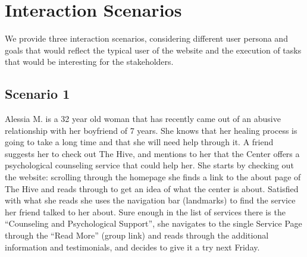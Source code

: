 \pagebreak
\section{Interaction Scenarios}
We provide three interaction scenarios, considering different user persona and goals that would reflect
the typical user of the website and the execution of tasks that would be interesting for the stakeholders.


\subsection{Scenario 1}
Alessia M. is a 32 year old woman that has recently came out of an abusive relationship with her boyfriend of 7 years.
She knows that her healing process is going to take a long time and that she will need help through it.
A friend suggests her to check out The Hive, and mentions to her that the Center offers a psychological counseling service
that could help her. She starts by checking out the website: scrolling through the homepage she finds a link to the about page
of The Hive and reads through to get an idea of what the center is about. Satisfied with what she reads she uses the navigation
bar (landmarks) to find the service her friend talked to her about. Sure enough in the list of services there is the “Counseling
and Psychological Support”, she navigates to the single Service Page through the “Read More” (group link) and reads through the
additional information and testimonials, and decides to give it a try next Friday.

